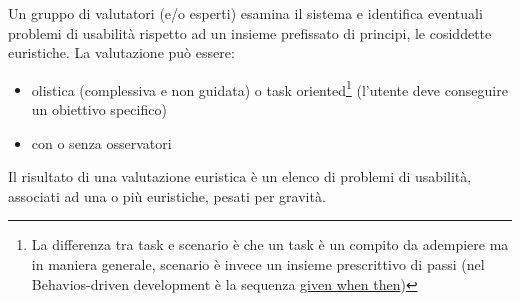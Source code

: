 \documentclass[11pt,a4paper]{book}
\begin{document}
Un gruppo di valutatori (e/o esperti) esamina il sistema e identifica eventuali problemi di usabilità rispetto ad un insieme prefissato di principi, le cosiddette euristiche. La valutazione può essere:
\begin{itemize}
	\item olistica (complessiva e non guidata) o task oriented\footnote{La differenza tra task e scenario è che un task è un compito da adempiere ma in maniera generale, scenario è invece un insieme prescrittivo di passi (nel Behavios-driven development è la sequenza \href{https://martinfowler.com/bliki/GivenWhenThen.html}{given when then})} (l'utente deve conseguire un obiettivo specifico)
	\item con o senza osservatori
\end{itemize}

Il risultato di una valutazione euristica è un elenco di problemi di usabilità, associati ad una o più euristiche, pesati per gravità.
\end{document}
